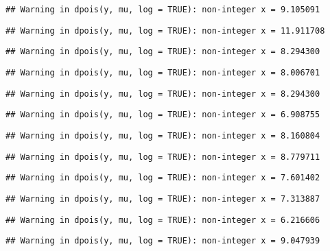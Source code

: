 \documentclass[
]{article}
\begin{document}
\begin{verbatim}
## Warning in dpois(y, mu, log = TRUE): non-integer x = 9.105091
\end{verbatim}

\begin{verbatim}
## Warning in dpois(y, mu, log = TRUE): non-integer x = 11.911708
\end{verbatim}

\begin{verbatim}
## Warning in dpois(y, mu, log = TRUE): non-integer x = 8.294300
\end{verbatim}

\begin{verbatim}
## Warning in dpois(y, mu, log = TRUE): non-integer x = 8.006701
\end{verbatim}

\begin{verbatim}
## Warning in dpois(y, mu, log = TRUE): non-integer x = 8.294300
\end{verbatim}

\begin{verbatim}
## Warning in dpois(y, mu, log = TRUE): non-integer x = 6.908755
\end{verbatim}

\begin{verbatim}
## Warning in dpois(y, mu, log = TRUE): non-integer x = 8.160804
\end{verbatim}

\begin{verbatim}
## Warning in dpois(y, mu, log = TRUE): non-integer x = 8.779711
\end{verbatim}

\begin{verbatim}
## Warning in dpois(y, mu, log = TRUE): non-integer x = 7.601402
\end{verbatim}

\begin{verbatim}
## Warning in dpois(y, mu, log = TRUE): non-integer x = 7.313887
\end{verbatim}

\begin{verbatim}
## Warning in dpois(y, mu, log = TRUE): non-integer x = 6.216606
\end{verbatim}

\begin{verbatim}
## Warning in dpois(y, mu, log = TRUE): non-integer x = 9.047939
\end{verbatim}
\end{document}
